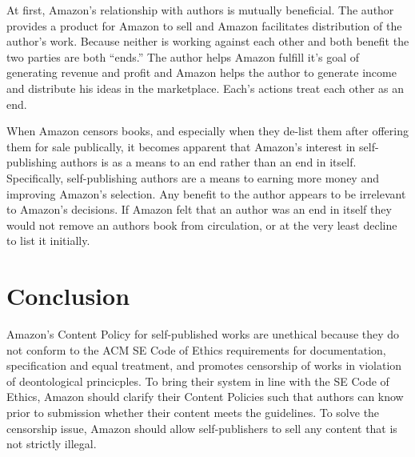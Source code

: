 \documentclass[11pt]{article}
\begin{document}
\begin{multicols}{2}
At first, Amazon's relationship with authors is mutually beneficial.  The author provides a product for Amazon to sell and Amazon facilitates distribution of the author's work.  Because neither is working against each other and both benefit the two parties are both ``ends.''  The author helps Amazon fulfill it's goal of generating revenue and profit and Amazon helps the author to generate income and distribute his ideas in the marketplace.  Each's actions treat each other as an end.

When Amazon censors books, and especially when they de-list them after offering them for sale publically, it becomes apparent that Amazon's interest in self-publishing authors is as a means to an end rather than an end in itself.  Specifically, self-publishing authors are a means to earning more money and improving Amazon's selection.  Any benefit to the author appears to be irrelevant to Amazon's decisions.  If Amazon felt that an author was an end in itself they would not remove an authors book from circulation, or at the very least decline to list it initially.


\section{Conclusion}
Amazon's Content Policy for self-published works are unethical because they do not conform to the ACM SE Code of Ethics requirements for documentation, specification and equal treatment, and promotes censorship of works in violation of deontological princicples.  To bring their system in line with the SE Code of Ethics, Amazon should clarify their Content Policies such that authors can know prior to submission whether their content meets the guidelines.  To solve the censorship issue, Amazon should allow self-publishers to sell any content that is not strictly illegal.

\end{multicols}
\newpage





\end{document}
